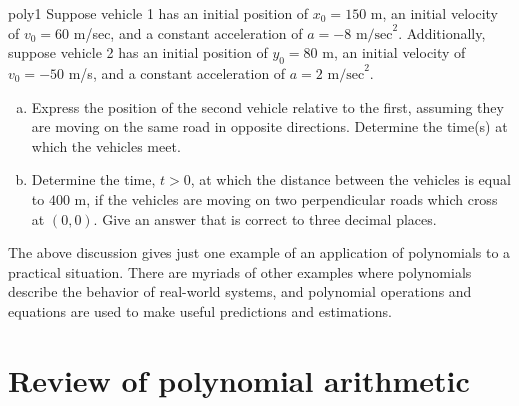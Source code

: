                                    
\begin{exercise}{poly1}
Suppose vehicle 1 has an initial position of $x_0=150$ m, an initial velocity of $v_0=60$  m/sec, and a constant acceleration of $a=-8$ $\text{m/sec}^2$. Additionally, suppose vehicle 2 has an initial position of $y_0=80$ $\text{m}$, an initial velocity of $ v_0=-50$  m/s, and a constant acceleration of $a=2$ $\text{m/sec}^2$.
\begin{enumerate}[(a)]
\item
Express the position of the second vehicle relative to the first, assuming they are moving on the same road in opposite directions. Determine the time(s) at which the vehicles meet.
\item
Determine the time, $t>0$, at which the distance between the vehicles is equal to $400$ $\text{m}$, if the vehicles are moving on two perpendicular roads which cross at $(0, 0)$. Give an answer that is correct to three decimal places.
\end{enumerate}
\end{exercise}

The above discussion gives just one example of an application of polynomials to a practical situation. There are myriads of other examples where polynomials describe the behavior of real-world systems, and polynomial operations and equations are used to make useful predictions and estimations. 

\section{Review of polynomial arithmetic\quad
{}}
\label{sec:Polynomials:PolynomialArithmetic}


